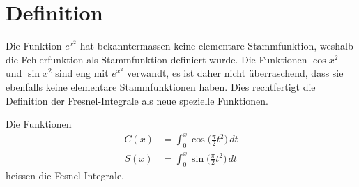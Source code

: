 %
%
%
\section{Definition\label{fresnel:section:teil0}}
Die Funktion $e^{x^2}$ hat bekanntermassen keine elementare Stammfunktion,
weshalb die Fehlerfunktion als Stammfunktion definiert wurde.
Die Funktionen $\cos x^2$ und $\sin x^2$ sind eng mit $e^{x^2}$
verwandt, es ist daher nicht überraschend, dass sie ebenfalls
keine elementare Stammfunktionen haben.
Dies rechtfertigt die Definition der Fresnel-Integrale als neue spezielle
Funktionen.

\begin{definition}
Die Funktionen 
\begin{align*}
C(x) &= \int_0^x \cos\biggl(\frac{\pi}2 t^2\biggr)\,dt
\\
S(x) &= \int_0^x \sin\biggl(\frac{\pi}2 t^2\biggr)\,dt
\end{align*}
heissen die Fesnel-Integrale.
\end{definition}

